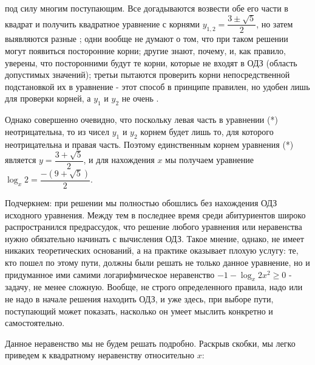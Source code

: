 
\setlength{\columnsep}{30pt}

\changefontsize{13pt}

\pagestyle{fancy}
\fancyhf{}
\renewcommand{\headrulewidth}{0pt} %

\begin{multicols}{2}
\noindent
под силу многим поступающим. Все догадываются возвести обе его части в квадрат и получить квадратное уравнение с корнями $y_{1,2} = \dfrac{3 \pm \sqrt{5}}{2}$, но затем выявляются разные ; одни вообще не думают о том, что при таком решении могут появиться посторонние корни; другие знают, почему, и, как правило, уверены, что посторонними будут те корни, которые не входят в ОДЗ (область допустимых значений); третьи пытаются проверить корни непосредственной подстановкой их в уравнение - этот способ в принципе правилен, но удобен лишь для проверки  корней, а $y_1$ и $y_2$ не очень .

Однако совершенно очевидно, что поскольку левая часть в уравнении (*) неотрицательна, то из чисел $y_1$ и $y_2$ корнем будет лишь то, для которого неотрицательна и правая часть. Поэтому единственным корнем уравнения (*) является $y = \dfrac{3 + \sqrt{5}}{2}$, и для нахождения $x$ мы получаем уравнение $\log_x 2 = \dfrac{-(9 + \sqrt{5})}{2}$.

Подчеркнем: при решении мы полностью обошлись без нахождения ОДЗ исходного уравнения. Между тем в последнее время среди абитуриентов широко распространился предрассудок, что решение любого уравнения или неравенства нужно обязательно начинать с вычисления ОДЗ. Такое мнение, однако, не имеет никаких теоретических оснований, а на практике оказывает плохую услугу: те, кто пошел по этому пути, должны были решать не только данное уравнение, но и придуманное ими самими логарифмическое неравенство $-1 - \log_x{2x^2} \geq 0$ - задачу, не менее сложную. Вообще, не строго определенного правила, надо или не надо в начале решения находить ОДЗ, и уже здесь, при выборе пути, поступающий может показать, насколько он умеет мыслить конкретно и самостоятельно.

\setcounter{taskcounter}{2}
\task Данное неравенство мы не будем решать подробно. Раскрыв скобки, мы легко приведем к квадратному неравенству относительно $x$:


\end{multicols}

